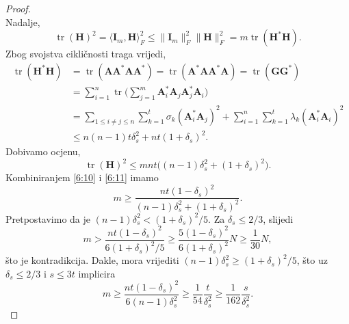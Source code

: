 \documentclass[a4paper,twoside,12pt]{memoir} %
\newcommand{\vect}[1]{\mathbf{#1}}
\renewcommand{\vec}{\vect}
\newcommand{\norm}[1]{\|{#1}\|}
\DeclareMathOperator{\tr}{tr}
\begin{document}
\begin{proof}
\begin{equation}
    \end{equation}
    Nadalje, 
    \begin{equation*}
        \tr(\vec H)^2 = \langle \vec I_m, \vec H \rangle^2_F \leq \norm{\vec I_m}^2_F \norm{\vec H}^2_F = m \tr(\vec H^* \vec H).
    \end{equation*}
    Zbog svojstva cikli\v{c}nosti traga vrijedi,
    \begin{align*}
        \tr(\vec H^* \vec H) &= \tr(\vec{AA}^*\vec{AA}^*) = \tr(\vec A^* \vec{AA}^* \vec A) = \tr(\vec{GG}^*) \\[1em]
        &= \sum_{i = 1}^n \tr \big(\sum_{j=1}^m \vec A^*_i \vec A_j \vec A^*_j \vec A_i \big ) \\[1em]
        &= \sum_{1 \leq i \neq j \leq n} \sum_{k=1}^t \sigma_k(\vec A^*_i \vec A_j)^2 + \sum_{i=1}^n \sum_{k=1}^t \lambda_k(\vec A^*_i \vec A_i)^2 \\[1em] 
        &\leq n(n-1)t \delta_s^2 + nt(1+\delta_s)^2.
    \end{align*}
    Dobivamo ocjenu,
    \begin{equation}\label{6:11}
        \tr(\vec H)^2 \leq m n t \big( (n-1)\delta_s^2 + (1+\delta_s)^2 \big) .
    \end{equation}
    Kombiniranjem \eqref{6:10} i \eqref{6:11} imamo
    \begin{equation*}
        m \geq \frac{nt(1-\delta_s)^2}{(n-1)\delta_s^2 + (1+\delta_s)^2}.  
    \end{equation*}
    Pretpostavimo da je $(n-1)\delta_s^2 < (1+\delta_s)^2/5$. Za $\delta_s \leq 2/3$, slijedi
    \begin{equation*}
        m > \frac{nt(1-\delta_s)^2}{6(1+\delta_s)^2/5}  \geq \frac{5(1-\delta_s)^2}{6(1+\delta_s)^2}N \geq \frac{1}{30}N,   
    \end{equation*}
    \v{s}to je kontradikcija. Dakle, mora vrijediti $(n-1)\delta_s^2 \geq (1+\delta_s)^2/5$, \v{s}to uz $\delta_s \leq 2/3$ i $s \leq 3t$ implicira
    \begin{equation*}
        m \geq \frac{nt(1-\delta_s)^2}{6(n-1)\delta_s^2} \geq \frac{1}{54} \frac{t}{\delta_s^2} \geq \frac{1}{162} \frac{s}{\delta_s^2}. 
    \end{equation*}
\end{proof}
\end{document}
